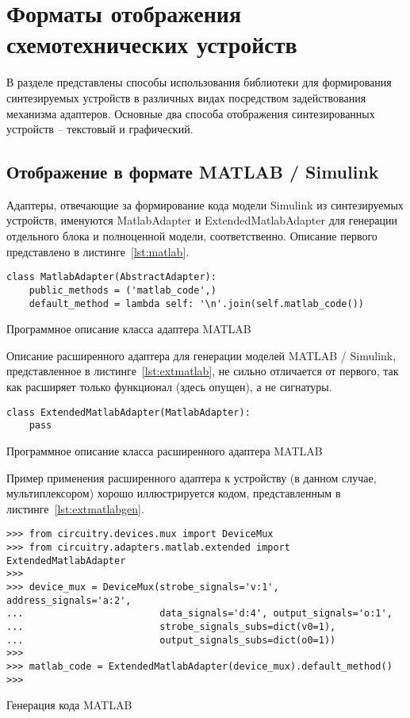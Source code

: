 \documentclass[document.tex]{subfiles}
\begin{document}
\clearpage\section{Форматы отображения схемотехнических устройств}
В разделе представлены способы использования библиотеки для формирования
синтезируемых устройств в различных видах посредством задействования механизма
адаптеров. Основные два способа отображения синтезированных устройств --
текстовый и графический.
\subsection{Отображение в формате MATLAB / Simulink}
Адаптеры, отвечающие за формирование кода модели Simulink из синтезируемых
устройств, именуются MatlabAdapter и ExtendedMatlabAdapter для генерации
отдельного блока и полноценной модели, соответственно. Описание первого
представлено в листинге~\ref{lst:matlab}.

\begin{listing}[ht]
\begin{verbatim}
class MatlabAdapter(AbstractAdapter):
    public_methods = ('matlab_code',)
    default_method = lambda self: '\n'.join(self.matlab_code())
\end{verbatim}
\caption{Программное описание класса адаптера MATLAB}
\label{lst:matlab}
\end{listing}

Описание расширенного адаптера для генерации моделей MATLAB / Simulink,
представленное в листинге~\ref{lst:extmatlab}, не сильно отличается от первого,
так как расширяет только функционал (здесь опущен), а не сигнатуры.
\begin{listing}[ht]
\begin{verbatim}
class ExtendedMatlabAdapter(MatlabAdapter):
    pass
\end{verbatim}
\caption{Программное описание класса расширенного адаптера MATLAB}
\label{lst:extmatlab}
\end{listing}

\clearpage

Пример применения расширенного адаптера к устройству (в данном случае,
мультиплексором) хорошо иллюстрируется кодом, представленным в
листинге~\ref{lst:extmatlabgen}.

\begin{listing}[ht]
\begin{verbatim}
>>> from circuitry.devices.mux import DeviceMux                         
>>> from circuitry.adapters.matlab.extended import ExtendedMatlabAdapter
>>>
>>> device_mux = DeviceMux(strobe_signals='v:1', address_signals='a:2',
...                        data_signals='d:4', output_signals='o:1',
...                        strobe_signals_subs=dict(v0=1),         
...                        output_signals_subs=dict(o0=1))
>>>
>>> matlab_code = ExtendedMatlabAdapter(device_mux).default_method()
>>> 
\end{verbatim}
\caption{Генерация кода MATLAB}
\label{lst:extmatlabgen}
\end{listing}
\end{document}
